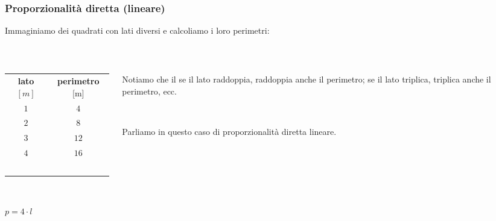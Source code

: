 \documentclass[]{beamer}
\begin{document}
\begin{frame}
\frametitle{Proporzionalità diretta (lineare)}
Immaginiamo dei quadrati con lati diversi e calcoliamo i loro perimetri:

~

\begin{columns}
\begin{column}{0.4\textwidth}
\centering
\begin{tabular}{c|c}
\textbf{lato} $ [m] $ & \textbf{perimetro} [m] \\\rule{0pt}{4ex}
$ 1 $ & $ 4 $ \\\rule{0pt}{3ex}
$ 2 $ & $ 8 $ \\\rule{0pt}{3ex}
$ 3 $ & $ 12 $ \\\rule{0pt}{3ex}
$ 4 $ & $ 16 $ \\\
\end{tabular}
~

$ p = 4\cdot l $
\end{column}
\begin{column}{0.4\textwidth}
\pause Notiamo che il \alert<2>{se il lato raddoppia, raddoppia anche il perimetro; se il lato triplica, triplica anche il perimetro}, ecc.\pause

~

Parliamo in questo caso di \alert<3>{proporzionalità diretta lineare}.
\end{column}
\end{columns}
\end{frame}
\end{document}
